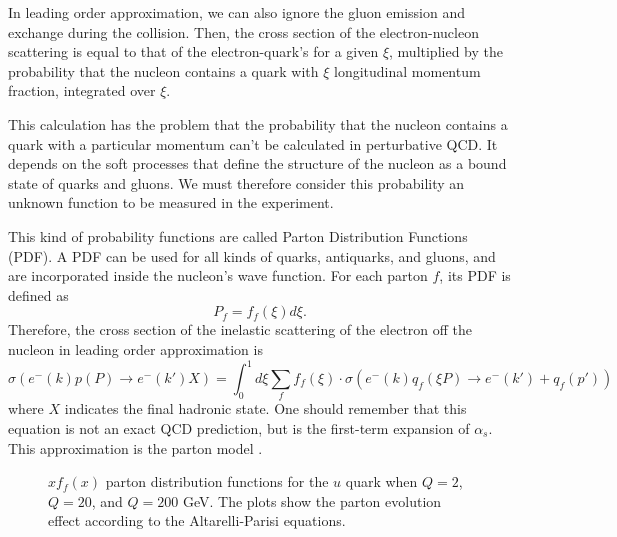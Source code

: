     In leading order approximation, we can also ignore the gluon emission and exchange during the collision.
    Then, the cross section of the electron-nucleon scattering is equal to that of the electron-quark's for a given $\xi$, multiplied by the probability that the nucleon contains a quark with $\xi$ longitudinal momentum fraction, integrated over $\xi$.
    
    This calculation has the problem that the probability that the nucleon contains a quark with a particular momentum can't be calculated in perturbative QCD.
    It depends on the soft processes that define the structure of the nucleon as a bound state of quarks and gluons.
    We must therefore consider this probability an unknown function to be measured in the experiment.

    This kind of probability functions are called Parton Distribution Functions (PDF).
    A PDF can be used for all kinds of quarks, antiquarks, and gluons, and are incorporated inside the nucleon's wave function.
    For each parton $f$, its PDF is defined as
    \begin{equation*}
        P_f = f_f(\xi)d\xi.
    \end{equation*}
    Therefore, the cross section of the inelastic scattering of the electron off the nucleon in leading order approximation is
    \begin{equation*}
        \sigma\left( e^-(k) p(P) \rightarrow e^-(k') X \right) =
                \int_0^1d\xi \sum_f f_f(\xi) \cdot
                \sigma\left( e^-(k) q_f(\xi P) \rightarrow e^-(k') + q_f(p') \right)
    \end{equation*}
    where $X$ indicates the final hadronic state.
    One should remember that this equation is not an exact QCD prediction, but is the first-term expansion of $\alpha_s$.
    This approximation is the parton model \cite{halzen1991}.
    
    \begin{figure}[b!] %
        \centering{}
        \caption[$Q^2$ dependence of $x$ PDF for the $u$ quark.]{$xf_f(x)$ parton distribution functions for the $u$ quark when $Q = 2$, $Q = 20$, and $Q = 200$ GeV.
        The plots show the parton evolution effect according to the Altarelli-Parisi equations.}
        \label{fig::q2dependenceu}
    \end{figure}

